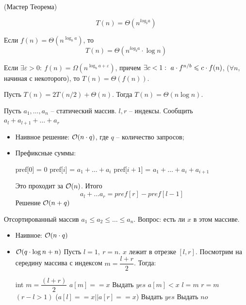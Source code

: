 \begin{multicols}{2}
\begin{theorema}{(Мастер Теорема)}{}
\begin{enumerate*}
\[                T(n) = \Theta(n^{log_ba})  
            \]
            \item Если $f(n) = \Theta (n^{\log_ba})$, то 
            \[
                T(n) = \Theta (n^{log_ba}\cdot \log n)
            \]
            \item Если $\exists \varepsilon > 0: \ f(n) = \Omega(n^{\log_ba + \varepsilon})$, причем $\exists c<1: \ \mathmbox{a\cdot f^{n/b} \leq c\cdot f(n)}$, ($\forall n$, начиная с некоторого), то $T(n) = \Theta (f(n))$.
        \end{enumerate*}
     \end{theorema}
     \cons Пусть $T(n) = 2T(n/2) + \Theta(n)$. Тогда $T(n) = \Theta(n\log n)$.
     \par
      Пусть $a_1, \ldots, a_n$ -- статический массив. $l,r$ -- индексы. Сообщить $a_l + a_{l+1} + \ldots + a_r$
     \par
     \begin{itemize}
        \item[] Наивное решение: ${\cal O}(n\cdot q)$, где $q$ -- количество запросов;
        \item[] Префиксные суммы:
        \begin{algorithmic}[1]
            \State pref[$0$] = $0$
            \State pref[$i$] = $a_1 + \ldots + a_i$
            \State pref[$i+1$] = $a_1 + \ldots + a_i + a_{i+1}$
        \end{algorithmic}
        Это проходит за ${\cal O}(n)$. Итого
        \[
            a_l + \ldots a_r = pref[r] - pref[l-1]  
        \]
        Решение ${\cal O}(n+q)$
     \end{itemize}
      Отсортированный массив $a_1 \leq a_2 \leq \ldots \leq a_n$. Вопрос: есть ли $x$ в этом массиве.
     \begin{itemize}
        \item[] Наивное: ${\cal O}(n\cdot q)$
        \item[] ${\cal O}(q\cdot \log n + n)$
        Пусть $l=1, \ r=n$. $x$ лежит в отрезке $[l,r]$. Посмотрим на середину массива с индексом $m = \dfrac{l+r}{2}$. Тогда:
        \begin{algorithmic}[1]
            \Repeat 
            \State int $m = \dfrac{(l+r)}{2}$
            \If  $a[m] == x$
            \State Выдать $yes$
            \ElsIf $a[m]<x$
            \State $l = m$
            \Else 
            \State $r=m$ 
            \EndIf
            \Until $(r-l>1)$
            \If ($a[l] == x || a[r] == x$)
            \State Выдать $yes$
            \Else
            \State Выдать $no$
            \EndIf
        \end{algorithmic}
     \end{itemize}

\end{multicols}
